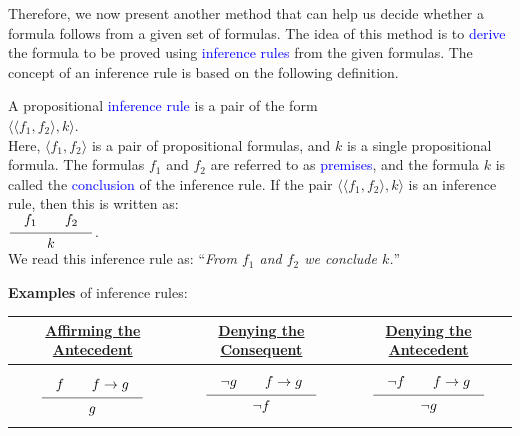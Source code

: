 Therefore, we now present another method that can help us decide
whether a formula follows from a given set of formulas. The idea of this method
is to \textcolor{blue}{derive} the formula to be proved using \textcolor{blue}{inference rules} from the
given formulas. The concept of an inference rule is based on the following definition. 
\begin{Definition} \hspace*{\fill} \linebreak
    A propositional \textcolor{blue}{inference rule} is a pair of the form  
    \\[0.2cm]
    \hspace*{1.3cm}
    $\bigl\langle \langle f_1, f_2 \rangle, k \bigr\rangle$.    
    \\[0.2cm]
    Here, $\langle f_1, f_2 \rangle$ is a pair of propositional formulas, and $k$ is a
    single propositional formula.   The formulas $f_1$ and $f_2$ are referred to as
    \textcolor{blue}{premises}, and the formula $k$ is called the \textcolor{blue}{conclusion} of the inference
    rule. If the pair $\bigl\langle \langle f_1, f_2 \rangle, k \bigr\rangle$ is an inference rule, then this is written as: 
    \\[0.3cm]
    \hspace*{1.3cm}      
    $\schluss{f_1 \qquad f_2}{k}$.
    \\[0.3cm]
    We read this inference rule as: 
    ``\textsl{From $f_1$ and $f_2$ we  conclude $k$.}''
    \eox
\end{Definition}

\noindent
\textbf{Examples} of inference rules:
\\[0.2cm]
\hspace*{1.3cm}            
\begin{tabular}[t]{|c|c|c|}
\hline
\rule{0pt}{15pt} \href{https://en.wikipedia.org/wiki/Modus_ponens}{Affirming the Antecedent} & 
 \href{https://en.wikipedia.org/wiki/Modus_tollens}{Denying the Consequent} &
 \href{https://en.wikipedia.org/wiki/Denying_the_antecedent}{Denying the Antecedent} \\[0.3cm]
\hline
$
\rule[-15pt]{0pt}{40pt}\schluss{f \quad\quad f \rightarrow g}{g}$ &
$\schluss{\neg g \quad\quad f \rightarrow g}{\neg f}$ &
$\schluss{\neg f \quad\quad f \rightarrow g}{\neg g}$ \\[0.3cm]
\hline
\end{tabular}
\\[0.3cm]\mbox{}

